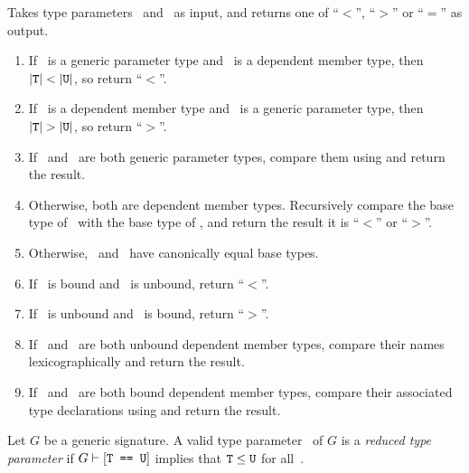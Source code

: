 \documentclass[../generics]{subfiles}
\begin{document}
\begin{algorithm}\label{type parameter order}
Takes type parameters \tT\ and \tU\ as input, and returns one of ``$<$'', ``$>$'' or ``$=$'' as output.
\begin{enumerate}
\item If \tT\ is a generic parameter type and \tU\ is a dependent member type, then $|\tT|<|\tU|$, so return ``$<$''.
\item If \tT\ is a dependent member type and \tU\ is a generic parameter type, then $|\tT|>|\tU|$, so return ``$>$''.
\item If \tT\ and \tU\ are both generic parameter types, compare them using  and return the result.
\item Otherwise, both are dependent member types. Recursively compare the base type of \tT\ with the base type of \tU, and return the result it is ``$<$'' or ``$>$''.

\item Otherwise, \tT\ and \tU\ have canonically equal base types.

\item If \tT\ is bound and \tU\ is unbound, return ``$<$''.
\item If \tT\ is unbound and \tU\ is bound, return ``$>$''.
\item If \tT\ and \tU\ are both unbound dependent member types, compare their names lexicographically and return the result.
\item If \tT\ and \tU\ are both bound dependent member types, compare their associated type declarations using  and return the result.
\end{enumerate}
\end{algorithm}

\begin{definition}
Let $G$ be a generic signature. A valid type parameter \tT\ of $G$ is a \emph{reduced type parameter} if $G\vdash[\texttt{T == U}]$ implies that $\texttt{T}\leq\texttt{U}$ for all~\tU.
\end{definition}
\end{document}
